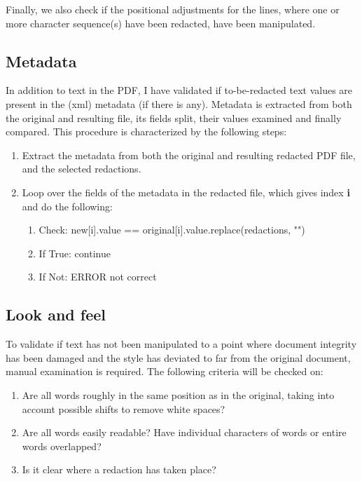 Finally, we also check if the positional adjustments for the lines, where one or more character sequence(s) have been redacted, have been manipulated.

\subsection{Metadata}

In addition to text in the PDF, I have validated if to-be-redacted text values are present in the (xml) metadata (if there is any). Metadata is extracted from both the original and resulting file, its fields split, their values examined and finally compared. This procedure is characterized by the following steps:

\begin{enumerate}
    \item Extract the metadata from both the original and resulting redacted PDF file, and the selected redactions.
    \item Loop over the fields of the metadata in the redacted file, which gives index \textbf{i} and do the following:
        \begin{enumerate}
            \item Check: new[i].value == original[i].value.replace(redactions, "")
            \item If True: continue
            \item If Not: ERROR not correct
        \end{enumerate}
\end{enumerate}

\subsection{Look and feel}
To validate if text has not been manipulated to a point where document integrity has been damaged and the style has deviated to far from the original document, manual examination is required. The following criteria will be checked on:

\begin{enumerate}
    \item Are all words roughly in the same position as in the original, taking into account possible shifts to remove white spaces?
    \item Are all words easily readable? Have individual characters of words or entire words overlapped?
    \item Is it clear where a redaction has taken place?
\end{enumerate}
